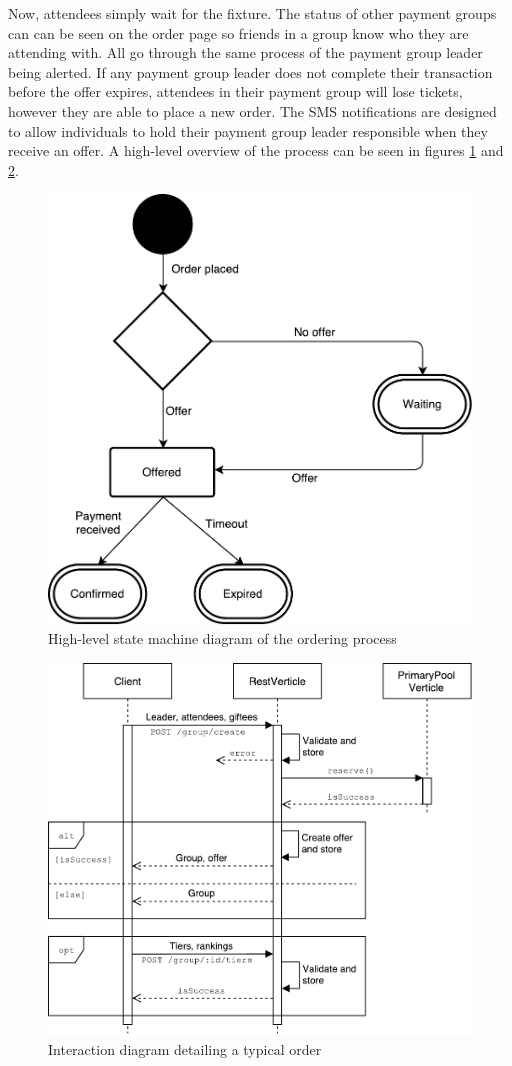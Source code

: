 \documentclass[12pt,a4paper]{bhamdissertation}
\begin{document}
Now, attendees simply wait for the fixture. The status of other payment groups can can be seen on the order page so friends in a group know who they are attending with. All go through the same process of the payment group leader being alerted. If any payment group leader does not complete their transaction before the offer expires, attendees in their payment group will lose tickets, however they are able to place a new order. The SMS notifications are designed to allow individuals to hold their payment group leader responsible when they receive an offer. A high-level overview of the process can be seen in figures \ref{img:order_state_diagram} and  \ref{img:order_interaction}.

\begin{figure}[!htbp]
    \centering
    \includegraphics[width=0.8\linewidth]{img/order_state_diagram.pdf}
    \caption{High-level state machine diagram of the ordering process}
    \label{img:order_state_diagram}
\end{figure}

\begin{figure}[!htbp]
    \centering
    \includegraphics[width=0.8\linewidth]{img/order_interaction.pdf}
    \caption{Interaction diagram detailing a typical order}
    \label{img:order_interaction}
\end{figure}
\end{document}
